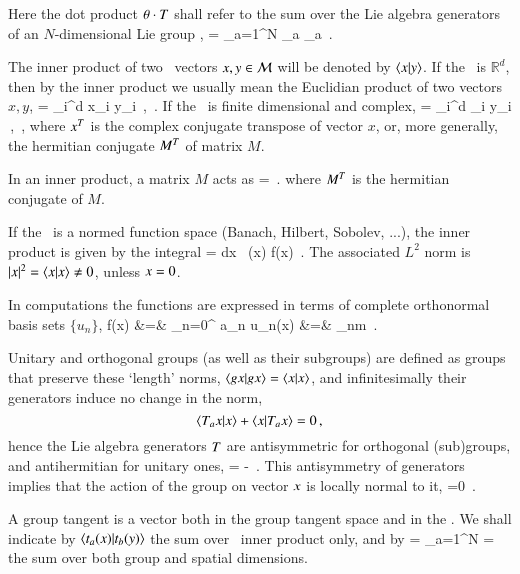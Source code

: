 Here the dot product ${\bf \theta} \cdot T$ shall refer to the sum over
the Lie algebra generators of an $N$-dimensional Lie group \Group,
\beq
\gSpace \cdot \Lg = \sum_{a=1}^N \gSpace_a \Lg_a
\,.

The inner product of two \statesp\ vectors $x, y \in \pS$ will be denoted by $\braket{x}{y}$. If the \statesp\ is $\mathbb{R}^d$, then by the inner product we usually mean the Euclidian product of two vectors $x,y$,
\beq
{} = \sum_i^d {x}_i y_i
    \,,\qquad \pS \subset \reals
\,.
If the \statesp\ is finite dimensional and complex,
\beq
{} = \sum_i^d _i y_i
    \,,\qquad \pS \subset \complex
\,,
where $\dual{x}$ is the complex conjugate transpose of vector $x$, or, more generally, the hermitian conjugate $\dual{M}$ of matrix $M$.

In an inner product, a matrix $M$ acts as
\beq
{} =
\,.
where $\dual{M}$ is the hermitian conjugate of $M$.

If the \statesp\ is a normed function space (Banach, Hilbert, Sobolev, ...),
the inner product is given by the integral
\beq
{} = \int dx \, (x) f(x)
\,.
The associated $L^2$ norm is
$|\ssp|^2 = \braket{\ssp}{\ssp} \neq 0$, unless $\ssp = 0$.

In computations the functions are expressed in terms of
complete orthonormal basis sets $\{u_n\}$,
\bea
f(x) &=& \sum_{n=0}^{\infty} a_n u_n(x)
    \continue
{} &=& \delta_{nm}
\,.
\label{basisL2}
\eea

Unitary and orthogonal groups (as well as their subgroups) are defined as groups that preserve these `length' norms, $\braket{\LieEl x}{\LieEl x} =  \braket{x}{x}$, and infinitesimally their generators  induce no change in the norm,
\[
\braket{ \Lg_a\ssp}{\ssp}
  +\braket{\ssp}{\Lg_a\ssp} =0
\,,
\]
hence the Lie algebra generators
$T$ are antisymmetric for orthogonal (sub)groups,
and antihermitian for unitary ones,
\beq
\dual{\Lg} = - \Lg
\,.
This antisymmetry of generators
implies that the action of the group on vector $x$ is
locally normal to it,
\beq
{} =0
\,.

A group tangent  is a vector both in the group
tangent space and in the \statesp.
We shall indicate by $\braket{\groupTan_{a}(x)}{\groupTan_{b}(y)}$  the sum over \statesp\ inner product only, and by
\beq
{} =
    \sum_{a=1}^N  =
the sum over both group and spatial dimensions.


